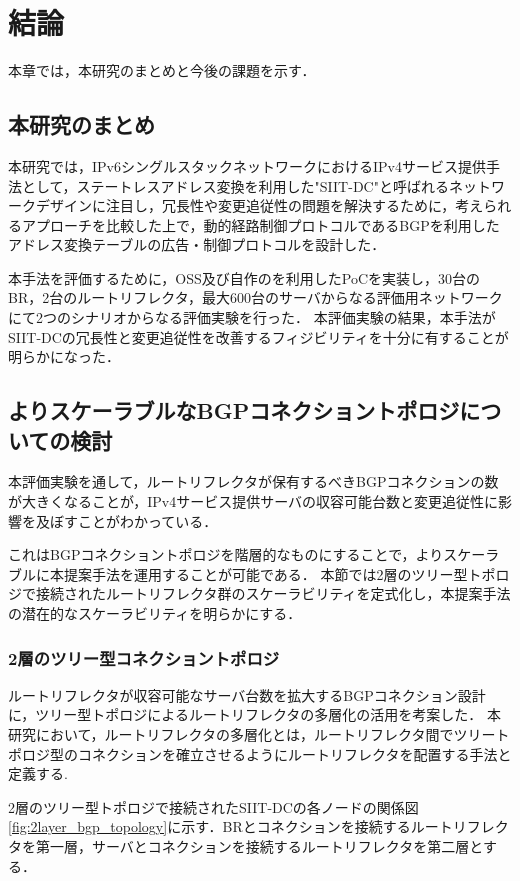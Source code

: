 \chapter{結論}
\label{conclusion}

本章では，本研究のまとめと今後の課題を示す．

\section{本研究のまとめ}
本研究では，IPv6シングルスタックネットワークにおけるIPv4サービス提供手法として，ステートレスアドレス変換を利用した"SIIT-DC"と呼ばれるネットワークデザインに注目し，冗長性や変更追従性の問題を解決するために，考えられるアプローチを比較した上で，動的経路制御プロトコルであるBGPを利用したアドレス変換テーブルの広告・制御プロトコルを設計した．

本手法を評価するために，OSS及び自作のを利用したPoCを実装し，30台のBR，2台のルートリフレクタ，最大600台のサーバからなる評価用ネットワークにて2つのシナリオからなる評価実験を行った．
本評価実験の結果，本手法がSIIT-DCの冗長性と変更追従性を改善するフィジビリティを十分に有することが明らかになった．

\section{よりスケーラブルなBGPコネクショントポロジについての検討}
\label{conclusion:tree}
本評価実験を通して，ルートリフレクタが保有するべきBGPコネクションの数が大きくなることが，IPv4サービス提供サーバの収容可能台数と変更追従性に影響を及ぼすことがわかっている．

これはBGPコネクショントポロジを階層的なものにすることで，よりスケーラブルに本提案手法を運用することが可能である．
本節では2層のツリー型トポロジで接続されたルートリフレクタ群のスケーラビリティを定式化し，本提案手法の潜在的なスケーラビリティを明らかにする．

\subsection{2層のツリー型コネクショントポロジ}
\label{conclusion:tree:2layer}

ルートリフレクタが収容可能なサーバ台数を拡大するBGPコネクション設計に，ツリー型トポロジによるルートリフレクタの多層化の活用を考案した．
本研究において，ルートリフレクタの多層化とは，ルートリフレクタ間でツリートポロジ型のコネクションを確立させるようにルートリフレクタを配置する手法と定義する.

2層のツリー型トポロジで接続されたSIIT-DCの各ノードの関係図\ref{fig:2layer_bgp_topology}に示す．BRとコネクションを接続するルートリフレクタを第一層，サーバとコネクションを接続するルートリフレクタを第二層とする．

